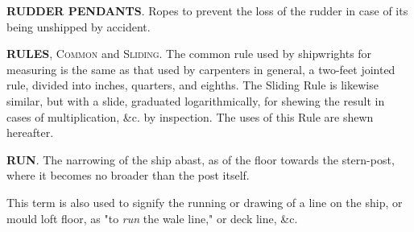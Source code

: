 \textbf{RUDDER PENDANTS}. Ropes to prevent the loss of the rudder in case of its being unshipped by accident. 

\textbf{RULES}, \textsc{Common} and \textsc{Sliding}. The common rule used by shipwrights for measuring is the same as that used by carpenters in general, a two-feet jointed rule, divided into inches, quarters, and eighths. The Sliding Rule is likewise similar, but with a slide, graduated logarithmically, for shewing the result in cases of multiplication, \&c. by inspection. The uses of this Rule are shewn hereafter. 

\textbf{RUN}. The narrowing of the ship abast, as of the floor towards the stern-post, where it becomes no broader than the post itself. 

This term is also used to signify the running or drawing of a line on the ship, or mould loft floor, as "to \textit{run} the wale line," or deck line, \&c. 
